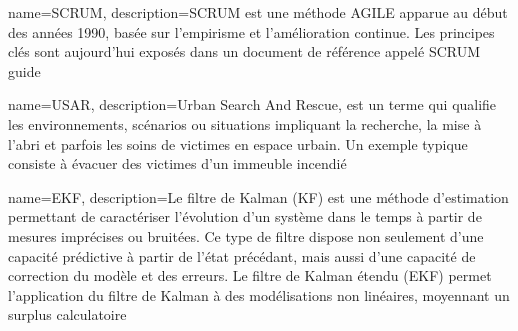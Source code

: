 {
  name={SCRUM},
    description={SCRUM est une méthode AGILE apparue au début des années 1990, basée sur l'empirisme et l'amélioration continue. Les principes clés sont aujourd'hui exposés dans un document de référence appelé SCRUM guide}
}

{
  name={USAR},
    description={Urban Search And Rescue, est un terme qui qualifie les environnements, scénarios ou situations impliquant la recherche, la mise à l'abri et parfois les soins de victimes en espace urbain. 
    Un exemple typique consiste à évacuer des victimes d'un immeuble incendié}
}

{
  name={EKF},
    description={Le filtre de Kalman (KF) est une méthode d'estimation permettant de caractériser l'évolution d'un système dans le temps à partir de mesures imprécises ou bruitées.
    Ce type de filtre dispose non seulement d'une capacité prédictive à partir de l'état précédant, mais aussi d'une capacité de correction du modèle et des erreurs.
    Le filtre de Kalman étendu (EKF) permet l'application du filtre de Kalman à des modélisations non linéaires, moyennant un surplus calculatoire}
}